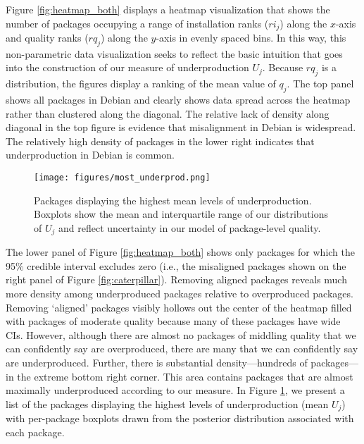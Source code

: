 \documentclass[10pt,conference]{IEEEtran}\usepackage[]{graphicx}\usepackage[usenames,dvipsnames]{color}
\begin{document}
Figure \ref{fig:heatmap_both} displays a heatmap visualization that shows the number of packages occupying a range of installation ranks ($ri_j$) along the $x$-axis and quality ranks ($rq_j$) along the $y$-axis in evenly spaced bins. In this way, this non-parametric data visualization seeks to reflect the basic intuition that goes into the construction of our measure of underproduction $U_j$.
Because $rq_j$ is a distribution, the figures display a ranking of the mean value of $q_j$. 
The top panel shows all packages in Debian and clearly shows data spread across the heatmap rather than clustered along the diagonal. The relative lack of density along diagonal in the top figure is evidence that misalignment in Debian is widespread. 
The relatively high density of packages in the lower right indicates that underproduction in Debian is common. 

\begin{figure}
\texttt{[image: figures/most\_underprod.png]}
\caption{Packages displaying the highest mean levels of underproduction. Boxplots show the mean and interquartile range of our distributions of $U_j$ and reflect uncertainty in our model of package-level quality.}
 \label{fig:worstOfWorst}
\end{figure} 
The lower panel of Figure \ref{fig:heatmap_both} shows only packages for which the 95\% credible interval excludes zero (i.e., the misaligned packages shown on the right panel of Figure \ref{fig:caterpillar}). Removing aligned packages reveals much more density among underproduced packages relative to overproduced packages. Removing `aligned' packages visibly hollows out the center of the heatmap filled with packages of moderate quality because many of these packages have wide CIs. However, although there are almost no packages of middling quality that we can confidently say are overproduced, there are many that we can confidently say are underproduced. Further, there is substantial density---hundreds of packages---in the extreme bottom right corner. This area contains packages that are almost maximally underproduced according to our measure.
In Figure \ref{fig:worstOfWorst}, we present a list of the packages displaying the highest levels of underproduction (mean $U_{j}$) with per-package boxplots drawn from the posterior distribution associated with each package. %
\end{document}

